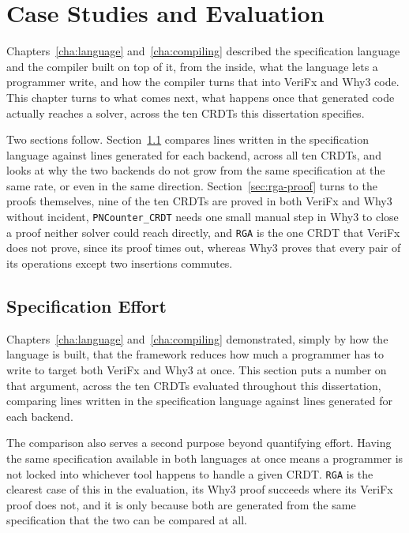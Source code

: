 
%

\chapter{Case Studies and Evaluation}
\label{cha:case-studies}

Chapters~\ref{cha:language} and~\ref{cha:compiling} described the specification language and the compiler built on top of
it, from the inside, what the language lets a programmer write, and how the compiler turns that into VeriFx and Why3 code.
This chapter turns to what comes next, what happens once that generated code actually reaches a solver, across the ten
CRDTs this dissertation specifies.

Two sections follow. Section~\ref{sec:spec-effort} compares lines written in the specification language against lines generated
for each backend, across all ten CRDTs, and looks at why the two backends do not grow from the same specification at the
same rate, or even in the same direction. Section~\ref{sec:rga-proof} turns to the proofs themselves, nine of the ten
CRDTs are proved in both VeriFx and Why3 without incident, \texttt{PNCounter\_CRDT} needs one small manual step in Why3
to close a proof neither solver could reach directly, and \texttt{RGA} is the one CRDT that VeriFx does not prove, since
its proof times out, whereas Why3 proves that every pair of its operations except two insertions commutes.

\section{Specification Effort}
\label{sec:spec-effort}

Chapters~\ref{cha:language} and~\ref{cha:compiling} demonstrated, simply by how the language is built, that the framework
reduces how much a programmer has to write to target both VeriFx and Why3 at once. This section puts a number on that
argument, across the ten CRDTs evaluated throughout this dissertation, comparing lines written in the specification
language against lines generated for each backend.

The comparison also serves a second purpose beyond quantifying effort. Having the same specification available in both
languages at once means a programmer is not locked into whichever tool happens to handle a given CRDT. \texttt{RGA} is
the clearest case of this in the evaluation, its Why3 proof succeeds where its VeriFx proof does not, and it is only
because both are generated from the same specification that the two can be compared at all.

